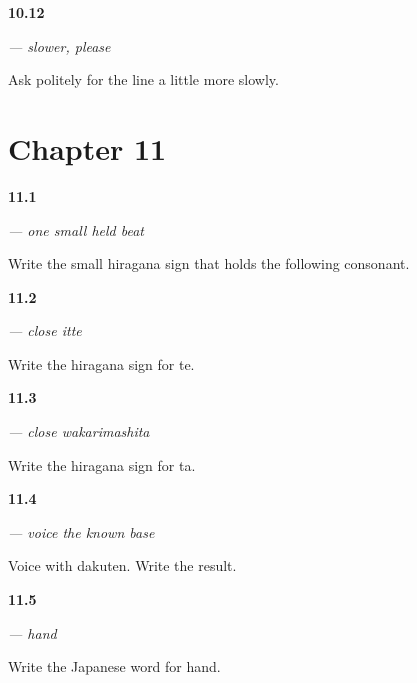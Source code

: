 \noindent\begin{minipage}[t]{\linewidth}
\raggedright
\hypertarget{review-JA-C10-slower-please-performance}{\textbf{10.12}} \emph{ — slower, please}\par
\small Ask politely for the line a little more slowly.
\end{minipage}\par\medskip

\section*{Chapter 11}

\noindent\begin{minipage}[t]{\linewidth}
\raggedright
\hypertarget{review-JA-W11-small-tsu-write}{\textbf{11.1}} \emph{ — one small held beat}\par
\small Write the small hiragana sign that holds the following consonant.
\end{minipage}\par\medskip

\noindent\begin{minipage}[t]{\linewidth}
\raggedright
\hypertarget{review-JA-W11-te-write}{\textbf{11.2}} \emph{ — close \emph{itte}}\par
\small Write the hiragana sign for te.
\end{minipage}\par\medskip

\noindent\begin{minipage}[t]{\linewidth}
\raggedright
\hypertarget{review-JA-W11-ta-write}{\textbf{11.3}} \emph{ — close \emph{wakarimashita}}\par
\small Write the hiragana sign for ta.
\end{minipage}\par\medskip

\noindent\begin{minipage}[t]{\linewidth}
\raggedright
\hypertarget{review-JA-W11-da-write}{\textbf{11.4}} \emph{ — voice the known base}\par
\small Voice  with dakuten. Write the result.
\end{minipage}\par\medskip

\noindent\begin{minipage}[t]{\linewidth}
\raggedright
\hypertarget{review-JA-C11-te-hand-meaning}{\textbf{11.5}} \emph{ — hand}\par
\small Write the Japanese word for hand.
\end{minipage}\par\medskip

